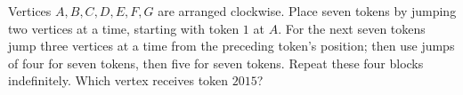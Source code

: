 Vertices $A,B,C,D,E,F,G$ are arranged clockwise. Place seven tokens by jumping two vertices at a time, starting with token $1$ at $A$. For the next seven tokens jump three vertices at a time from the preceding token's position; then use jumps of four for seven tokens, then five for seven tokens. Repeat these four blocks indefinitely. Which vertex receives token $2015$?
